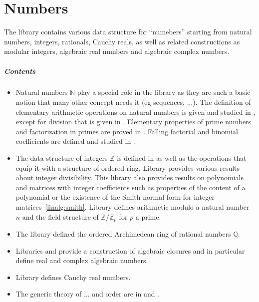 \chapter{Numbers}

The library contains various data structure for ``numebers'' 
starting from natural numbers, integers, rationals, Cauchy reals, as well as
related constructions as modular integers, algebraic real numbers and algebraic
complex numbers.

\paragraph{Contents}
\begin{itemize}
	
\item
Natural numbers $\mathbb{N}$ play a special role in the \mcbMC{} library as they
are such a basic notion that many other concept needs it (eg sequences, ...).
The definition of elementary arithmetic operations on natural numbers 
is given and studied in , except for division
that is given in .  Elementary properties of
prime numbers and factorization in primes are proved in
.  Falling factorial and binomial coefficients are defined
and studied in .

\item
The data structure of integers $\mathbb{Z}$ is defined in 
as well as the operations that equip it with a structure of
ordered ring. Library  provides various
results about integer divisibility.  This library also provides
results on polynomials and matrices with integer coefficients
such as properties of the content of a polynomial or the 
existence of the Smith normal form for integer matrices~\ref{linalg:smith}.
Library  defines arithmetic modulo a natural number $n$
and the field structure of $\mathbb{Z}/\mathbb{Z}_p$ for $p$ a prime.

\item
The library  defined the ordered Archimedean ring of
rational numbers $\mathbb{Q}$.

\item
Libraries  and 
provide a construction of algebraic closures and in particular define
real and complex algebraic numbers.

\item
Library  defines Cauchy real numbers.

\item
The generic theory of ... and order are in 
and .

\end{itemize}

